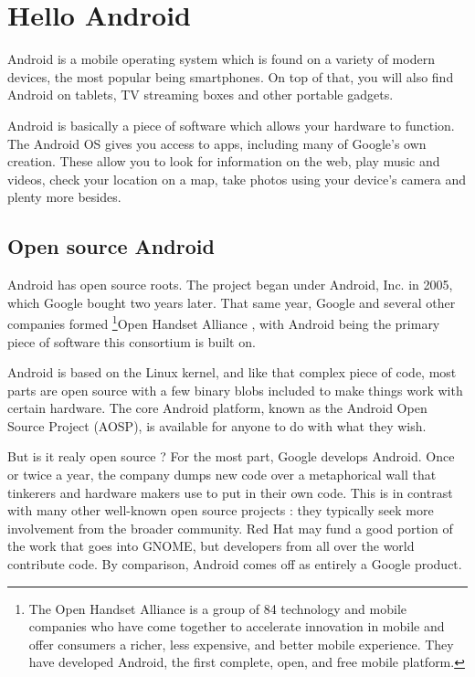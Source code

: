 
\chapter{Hello Android}
Android\cite{Todd2017} is a mobile operating system which is found on a variety of modern devices, the most popular being smartphones. On top of that, you will also find Android on tablets, TV streaming boxes and other portable gadgets.

Android is basically a piece of software which allows your hardware to function. The Android OS gives you access to apps, including many of Google's own creation. These allow you to look for information on the web, play music and videos, check your location on a map, take photos using your device's camera and plenty more besides.

\section{Open source Android}
Android has open source roots. The project began under Android, Inc. in 2005, which Google bought two years later. That same year, Google and several other companies formed  \footnote{The Open Handset Alliance is a group of 84 technology and mobile companies who have come together to accelerate innovation in mobile and offer consumers a richer, less expensive, and better mobile experience. They have developed Android, the first complete, open, and free mobile platform.}{Open Handset Alliance} \cite{alliance}, with Android being the primary piece of software this consortium is built on.

Android is based on the Linux kernel, and like that complex piece of code, most parts are open source with a few binary blobs included to make things work with certain hardware. The core Android platform, known as the Android Open Source Project (AOSP), is available for anyone to do with what they wish.

But is it realy open source ? For the most part, Google develops Android. Once or twice a year, the company dumps  new code over a metaphorical wall that tinkerers and hardware makers use to put in their own code. This is in contrast with many other well-known open source projects : they typically seek more involvement from the broader community. Red Hat may fund a good portion of the work that goes into GNOME, but developers from all over the world contribute code. By comparison, Android comes off as entirely a Google product.



